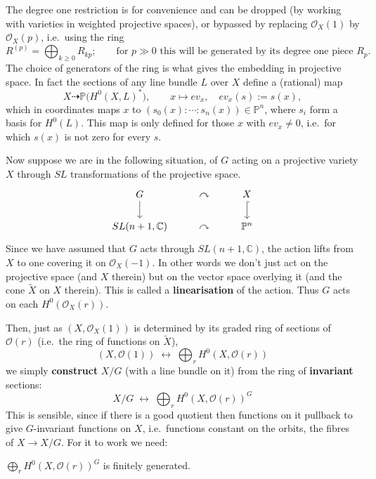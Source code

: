 \documentclass[12pt]{article}
\begin{document}
The degree one restriction is for convenience and can be dropped (by working with varieties 
in weighted projective spaces), or bypassed by replacing $\mathcal{O}_X(1)$ by $\mathcal{O}_X(p)$, 
i.e.~using the ring
\[
R^{(p)} = \bigoplus_{k \ge 0} R_{kp}; \qquad \text{for $p \gg 0$ this will be generated by its degree one piece $R_p$.}
\]
The choice of generators of the ring is what gives the embedding in projective space. In fact 
the sections of any line bundle $L$ over $X$ define a (rational) map
\begin{equation} \label{eq:map}
X \dashrightarrow \mathbb{P}\big(H^0(X,L)^*\big), 
\qquad 
x \mapsto ev_x, 
\quad 
ev_x(s) := s(x),
\end{equation}
which in coordinates maps $x$ to $(s_0(x):\cdots:s_n(x)) \in \mathbb{P}^n$, where $s_i$ form a basis for $H^0(L)$. This map is only defined for those $x$ with $ev_x \neq 0$, 
i.e.~for which $s(x)$ is not zero for every $s$. 

Now suppose we are in the following situation, of $G$ acting on a projective variety 
$X$ through $SL$ transformations of the projective space.
\[
\begin{tikzcd}
G \arrow[d] & \curvearrowright & X \arrow[d,hook] \\
SL(n+1,\mathbb{C}) & \curvearrowright & \mathbb{P}^n
\end{tikzcd}
\]
Since we have assumed that $G$ acts through $SL(n+1,\mathbb{C})$, the action lifts from $X$ to one covering it on $\mathcal{O}_X(-1)$. In other words we don't just act on the projective space (and $X$ therein) 
but on the vector space overlying it (and the cone $\widetilde{X}$ on $X$ therein). This 
is called a \textbf{linearisation} of the action. Thus $G$ acts on each 
$H^0(\mathcal{O}_X(r))$.

Then, just as $(X,\mathcal{O}_X(1))$ is determined by its graded ring of sections of 
$\mathcal{O}(r)$ (i.e.~the ring of functions on $\widetilde{X}$),
\[
(X,\mathcal{O}(1)) \;\longleftrightarrow\; \bigoplus_r H^0(X,\mathcal{O}(r))
\]
we simply \textbf{construct} $X/G$ (with a line bundle on it) from the ring of 
\textbf{invariant} sections:
\[
X/G \;\longleftrightarrow\; \bigoplus_r H^0(X,\mathcal{O}(r))^G
\]
This is sensible, since if there is a good quotient then functions on it pullback to give 
$G$-invariant functions on $X$, i.e.~functions constant on the orbits, the fibres of 
$X \to X/G$. For it to work we need:
\begin{lemma}
$\bigoplus_r H^0(X,\mathcal{O}(r))^G$ is finitely generated.
\end{lemma}
\end{document}

